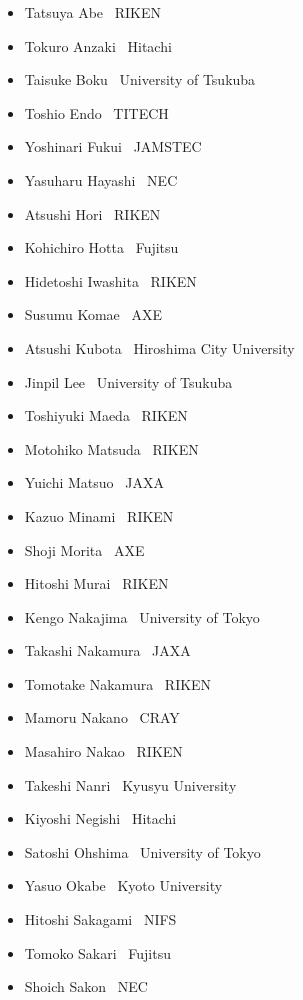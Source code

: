 \documentclass[a4paper,11pt,twoside]{report}
\begin{document}
\begin{itemize}
\setlength{\itemsep}{-1mm}
\item Tatsuya Abe        \dotfill \ RIKEN
\item Tokuro Anzaki      \dotfill \ Hitachi
\item Taisuke Boku       \dotfill \ University of Tsukuba
\item Toshio Endo        \dotfill \ TITECH
\item Yoshinari Fukui    \dotfill \ JAMSTEC
\item Yasuharu Hayashi   \dotfill \ NEC
\item Atsushi Hori       \dotfill \ RIKEN
\item Kohichiro Hotta    \dotfill \ Fujitsu
\item Hidetoshi Iwashita \dotfill \ RIKEN
\item Susumu Komae       \dotfill \ AXE
\item Atsushi Kubota     \dotfill \ Hiroshima City University
\item Jinpil Lee         \dotfill \ University of Tsukuba
\item Toshiyuki Maeda    \dotfill \ RIKEN
\item Motohiko Matsuda   \dotfill \ RIKEN
\item Yuichi Matsuo      \dotfill \ JAXA
\item Kazuo Minami       \dotfill \ RIKEN
\item Shoji Morita       \dotfill \ AXE
\item Hitoshi Murai      \dotfill \ RIKEN
\item Kengo Nakajima     \dotfill \ University of Tokyo
\item Takashi Nakamura   \dotfill \ JAXA
\item Tomotake Nakamura  \dotfill \ RIKEN
\item Mamoru Nakano      \dotfill \ CRAY
\item Masahiro Nakao     \dotfill \ RIKEN
\item Takeshi Nanri      \dotfill \ Kyusyu University
\item Kiyoshi Negishi    \dotfill \ Hitachi
\item Satoshi Ohshima    \dotfill \ University of Tokyo
\item Yasuo Okabe        \dotfill \ Kyoto University
\item Hitoshi Sakagami   \dotfill \ NIFS
\item Tomoko Sakari      \dotfill \ Fujitsu
\item Shoich Sakon       \dotfill \ NEC

\end{itemize}
\end{document}
